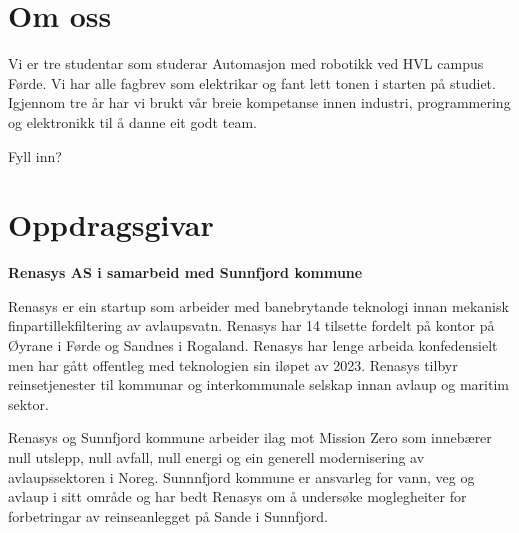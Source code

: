 
\thispagestyle{fancy}

\section{Om oss}

Vi er tre studentar som studerar Automasjon med robotikk ved HVL campus Førde.
Vi har alle fagbrev som elektrikar og fant lett tonen i starten på studiet.
Igjennom tre år har vi brukt vår breie kompetanse innen industri, programmering og elektronikk
til å danne eit godt team.

Fyll inn?


\section{Oppdragsgivar}
\textbf{Renasys AS i samarbeid med Sunnfjord kommune}

Renasys er ein startup som arbeider med banebrytande teknologi innan mekanisk finpartillekfiltering av avlaupsvatn.
Renasys har 14 tilsette fordelt på kontor på Øyrane i Førde og Sandnes i Rogaland. 
Renasys har lenge arbeida konfedensielt men har gått offentleg med teknologien sin iløpet av 2023. Renasys tilbyr reinsetjenester til kommunar og interkommunale selskap innan avlaup og maritim sektor.

Renasys og Sunnfjord kommune arbeider ilag mot Mission Zero som innebærer 
null utslepp, null avfall, null energi og ein generell modernisering av avlaupssektoren i Noreg.
Sunnnfjord kommune er ansvarleg for vann, veg og avlaup i sitt område og har bedt 
Renasys om å undersøke moglegheiter for forbetringar av reinseanlegget på Sande i Sunnfjord.